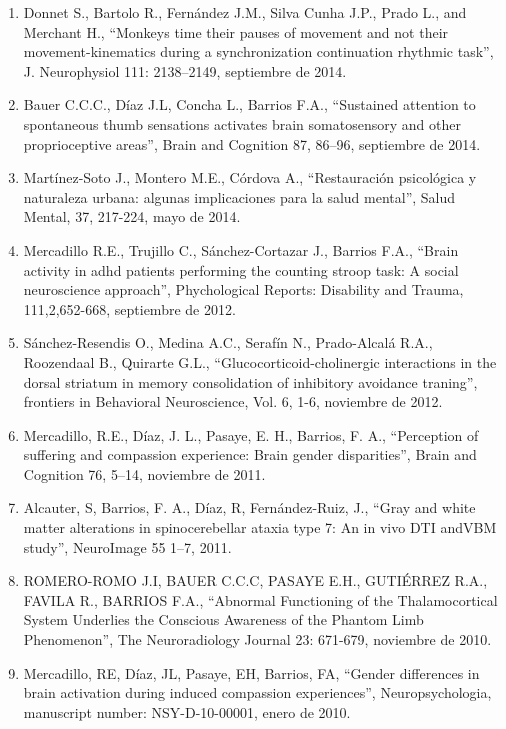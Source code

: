 \begin{enumerate}
\item Donnet S., Bartolo R., Fernández J.M., Silva Cunha J.P., Prado L., and Merchant H., “Monkeys time their pauses of movement and not 
their 
movement-kinematics during a synchronization continuation rhythmic task”, J. Neurophysiol 111: 2138–2149, septiembre de 2014.

\item Bauer C.C.C., Díaz J.L, Concha L., Barrios F.A., “Sustained attention to spontaneous thumb sensations activates brain somatosensory and 
other 
proprioceptive areas”, Brain and Cognition 87, 86–96, septiembre de 2014.

\item Martínez-Soto J., Montero M.E., Córdova A., “Restauración psicológica y naturaleza urbana: algunas implicaciones para la salud mental”, 
Salud 
Mental, 37, 217-224, mayo de 2014.

\item Mercadillo R.E., Trujillo C., Sánchez-Cortazar J., Barrios F.A., “Brain activity in adhd patients performing the counting stroop task: 
A 
social neuroscience approach”, Phychological Reports: Disability and Trauma, 111,2,652-668, septiembre de 2012.

\item Sánchez-Resendis O., Medina A.C., Serafín N., Prado-Alcalá R.A., Roozendaal B., Quirarte G.L., “Glucocorticoid-cholinergic interactions 
in 
the dorsal striatum in memory consolidation of inhibitory avoidance traning”, frontiers in Behavioral Neuroscience, Vol. 6, 1-6, noviembre de 
2012.

\item Mercadillo, R.E., Díaz, J. L., Pasaye, E. H., Barrios, F. A., “Perception of suffering and compassion experience: Brain gender 
disparities”, 
Brain and Cognition 76, 5–14, noviembre de 2011.

\item Alcauter, S, Barrios, F. A., Díaz, R, Fernández-Ruiz, J., “Gray and white matter alterations in spinocerebellar ataxia type 7: An in 
vivo DTI 
andVBM study”, NeuroImage 55 1–7, 2011.

\item ROMERO-ROMO J.I, BAUER C.C.C, PASAYE E.H., GUTIÉRREZ R.A., FAVILA R., BARRIOS F.A., “Abnormal Functioning of the Thalamocortical System 
Underlies the Conscious Awareness of the Phantom Limb Phenomenon”, The Neuroradiology Journal 23: 671-679, noviembre de 2010.

\item Mercadillo, RE, Díaz, JL, Pasaye, EH, Barrios, FA, “Gender differences in brain activation during induced compassion experiences”, 
Neuropsychologia, manuscript number: NSY-D-10-00001, enero de 2010.


\end{enumerate}
